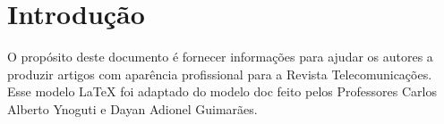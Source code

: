 \section{Introdução}

O propósito deste documento é fornecer informações para ajudar os autores a produzir artigos com aparência profissional para a Revista Telecomunicações. Esse modelo LaTeX foi adaptado do modelo doc feito pelos Professores Carlos Alberto Ynoguti e Dayan Adionel Guimarães.

